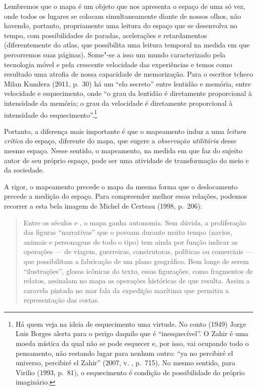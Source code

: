 Lembremos que o mapa é um objeto que nos apresenta o espaço de uma só
vez, onde todos os lugares se colocam simultaneamente diante de nossos
olhos, não havendo, portanto, propriamente uma leitura do espaço que se
desenvolva no tempo, com possibilidades de paradas, acelerações e
retardamentos (diferentemente do atlas, que possibilita uma leitura
temporal na medida em que percorremos suas páginas). Some"-se a isso um
mundo caracterizado pela tecnologia móvel e pela crescente velocidade
das experiências e temos como resultado uma atrofia de nossa capacidade
de memorização. Para o escritor tcheco Milan Kundera (2011, p.~30) há um
``elo secreto'' entre lentidão e memória, entre velocidade e
esquecimento, onde ``o grau da lentidão é diretamente proporcional à
intensidade da memória; o grau da velocidade é diretamente
proporcional à intensidade do esquecimento''.\footnote{Há quem veja na
  ideia de esquecimento uma virtude. No conto {} (1949)
  Jorge Luis Borges alerta para o perigo daquilo que é ``inesquecível''.
  O Zahir é uma moeda mística da qual não se pode esquecer e, por isso,
  vai ocupando todo o pensamento, não restando lugar para nenhum outro:
  ``ya no percibiré el universo, percibiré el Zahir'' (2007, v. , p.~715). No mesmo sentido, para Virilio (1993, p.~81), o esquecimento é
  condição de possibilidade do próprio imaginário.}

Portanto, a diferença mais importante é que o mapeamento induz a uma
\emph{leitura crítica} do espaço, diferente do mapa, que sugere a
\emph{observação utilitária} desse mesmo espaço. Nesse sentido, o
mapeamento, na medida em que faz do sujeito autor de seu próprio espaço,
pode ser uma atividade de transformação do meio e da sociedade.

A rigor, o mapeamento precede o mapa da mesma forma que o deslocamento
precede a medição do espaço. Para compreender melhor essas relações,
podemos recorrer a esta bela imagem de Michel de Certeau (1998, p.~206):

\begin{quote}
Entre os séculos  e , o mapa ganha autonomia. Sem dúvida, a
proliferação das figuras ``narrativas'' que o povoam durante muito tempo
(navios, animais e personagens de todo o tipo) tem ainda por função
indicar as operações --- de viagem, guerreiras, construtoras, políticas
ou comerciais --- que possibilitam a fabricação de um plano geográfico.
Bem longe de serem ``ilustrações'', glosas icônicas do texto, essas
figurações, como fragmentos de relatos, assinalam no mapa as operações
históricas de que resulta. Assim a caravela pintada no mar fala da
expedição marítima que permitiu a representação das costas.
\end{quote}

